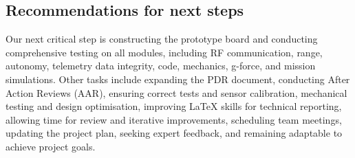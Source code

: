 \subsection{Recommendations for next steps}
Our next critical step is constructing the prototype board and conducting comprehensive testing on all modules, including RF communication, range, autonomy, telemetry data integrity, code, mechanics, g-force, and mission simulations. Other tasks include expanding the PDR document, conducting After Action Reviews (AAR), ensuring correct tests and sensor calibration, mechanical testing and design optimisation, improving LaTeX skills for technical reporting, allowing time for review and iterative improvements, scheduling team meetings, updating the project plan, seeking expert feedback, and remaining adaptable to achieve project goals. 
